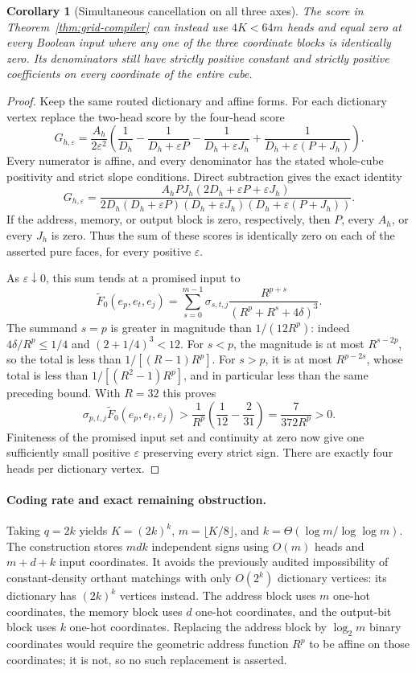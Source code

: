 \documentclass[11pt]{article}
\newtheorem{corollary}[theorem]{Corollary}
\begin{document}
\begin{corollary}[Simultaneous cancellation on all three axes]
\label{cor:grid-axes}
The score in Theorem~\ref{thm:grid-compiler} can instead use
$4K<64m$ heads and equal zero at every Boolean input where
any one of the three coordinate blocks is identically zero.
Its denominators still have strictly positive constant and strictly
positive coefficients on every coordinate of the entire cube.
\end{corollary}
\begin{proof}
Keep the same routed dictionary and affine forms. For each dictionary
vertex replace the two-head score by the four-head score
\[
 G_{h,\varepsilon}=
 \frac{A_h}{2\varepsilon^2}
 \left(\frac1{D_h}-\frac1{D_h+\varepsilon P}
       -\frac1{D_h+\varepsilon J_h}
       +\frac1{D_h+\varepsilon(P+J_h)}\right).
\]
Every numerator is affine, and every denominator has the stated
whole-cube positivity and strict slope conditions. Direct subtraction
gives the exact identity
\[
 G_{h,\varepsilon}
 =\frac{A_h P J_h(2D_h+\varepsilon P+\varepsilon J_h)}
 {2D_h(D_h+\varepsilon P)(D_h+\varepsilon J_h)
       (D_h+\varepsilon(P+J_h))}.
\]
If the address, memory, or output block is zero, respectively,
then $P$, every $A_h$, or every $J_h$ is zero. Thus the sum of
these scores is identically zero on each of the asserted pure faces,
for every positive $\varepsilon$.

As $\varepsilon\downarrow0$, this sum tends at a promised input to
\[
 \widetilde F_0(e_p,e_t,e_j)
 =\sum_{s=0}^{m-1}\sigma_{s,t,j}
       \frac{R^{p+s}}{(R^p+R^s+4\delta)^3}.
\]
The summand $s=p$ is greater in magnitude than $1/(12R^p)$:
indeed $4\delta/R^p\leq1/4$ and $(2+1/4)^3<12$.
For $s<p$, the magnitude is at most $R^{s-2p}$, so the total
is less than $1/[(R-1)R^p]$. For $s>p$, it is at most
$R^{p-2s}$, whose total is less than
$1/[(R^2-1)R^p]$, and in particular less than the same preceding
bound. With $R=32$ this proves
\[
 \sigma_{p,t,j}\widetilde F_0(e_p,e_t,e_j)
 >\frac1{R^p}\left(\frac1{12}-\frac2{31}\right)
 =\frac7{372R^p}>0.
\]
Finiteness of the promised input set and continuity at zero now give
one sufficiently small positive $\varepsilon$ preserving every
strict sign. There are exactly four heads per dictionary vertex.
\end{proof}

\paragraph{Coding rate and exact remaining obstruction.}
Taking $q=2k$ yields $K=(2k)^k$, $m=\lfloor K/8\rfloor$, and
$k=\Theta(\log m/\log\log m)$. The construction stores $mdk$
independent signs using $O(m)$ heads and $m+d+k$ input coordinates.
It avoids the previously audited impossibility of constant-density
orthant matchings with only $O(2^k)$ dictionary vertices: its dictionary
has $(2k)^k$ vertices instead. The address block uses $m$ one-hot
coordinates, the memory block uses $d$ one-hot coordinates, and the
output-bit block uses $k$ one-hot coordinates. Replacing the address
block by $\log_2m$ binary coordinates would require the geometric
address function $R^p$ to be affine on those coordinates; it is not,
so no such replacement is asserted.
\end{document}

